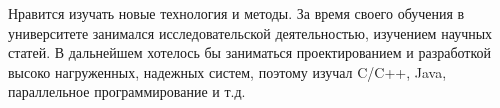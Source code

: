 

\begin{cvparagraph}

Нравится изучать новые технология и методы. За время своего обучения в университете занимался исследовательской деятельностью, изучением научных статей.
В дальнейшем хотелось бы заниматься проектированием и разработкой высоко нагруженных, надежных систем, поэтому изучал C/C++, Java, параллельное программирование и т.д.
\end{cvparagraph}
